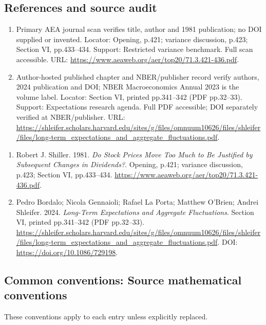 \documentclass[11pt,a4paper]{article}
\begin{document}
\subsection*{References and source audit}
\begin{enumerate}
\item Primary AEA journal scan verifies title, author and 1981 publication; no DOI supplied or invented. Locator: Opening, p.421; variance discussion, p.423; Section VI, pp.433--434. Support: Restricted variance benchmark. Full scan accessible. URL: \url{https://www.aeaweb.org/aer/top20/71.3.421-436.pdf}.
\item Author-hosted published chapter and NBER/publisher record verify authors, 2024 publication and DOI; NBER Macroeconomics Annual 2023 is the volume label. Locator: Section VI, printed pp.341--342 (PDF pp.32--33). Support: Expectations research agenda. Full PDF accessible; DOI separately verified at NBER/publisher. URL: \url{https://shleifer.scholars.harvard.edu/sites/g/files/omnuum10626/files/shleifer/files/long-term_expectations_and_aggregate_fluctuations.pdf}.
\end{enumerate}
\begin{enumerate}\raggedright
\item\hypertarget{definitions:source:30007593:1}{} Robert J. Shiller. 1981. \emph{Do Stock Prices Move Too Much to Be Justified by Subsequent Changes in Dividends?}. Opening, p.421; variance discussion, p.423; Section VI, pp.433--434.
\url{https://www.aeaweb.org/aer/top20/71.3.421-436.pdf}.
\item\hypertarget{definitions:source:30007593:2}{} Pedro Bordalo; Nicola Gennaioli; Rafael La Porta; Matthew O'Brien; Andrei Shleifer. 2024. \emph{Long-Term Expectations and Aggregate Fluctuations}. Section VI, printed pp.341--342 (PDF pp.32--33).
\url{https://shleifer.scholars.harvard.edu/sites/g/files/omnuum10626/files/shleifer/files/long-term_expectations_and_aggregate_fluctuations.pdf}.
DOI: \url{https://doi.org/10.1086/729198}.
\end{enumerate}

\subsection*{Common conventions: Source mathematical conventions}

These conventions apply to each entry unless explicitly replaced.
\end{document}
